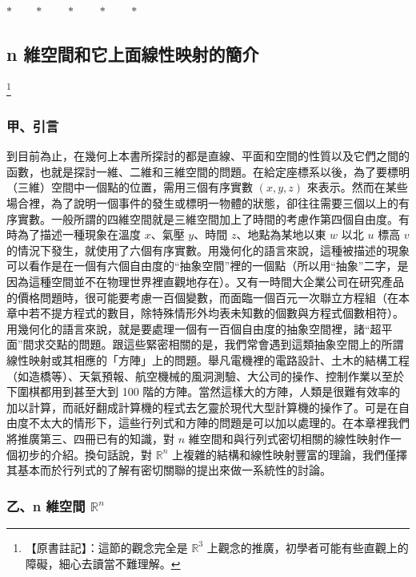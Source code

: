 \begin{center}
$* \qquad * \qquad * \qquad * \qquad *$
\end{center}

\subsection{n 維空間和它上面線性映射的簡介}\label{sec:b6s-1-1}
\footnote{【原書註記】：這節的觀念完全是 $\mathbb{R}^3$ 上觀念的推廣，初學者可能有些直觀上的障礙，細心去讀當不難理解。}

\subsubsection*{甲、引言}\label{subsec:b6s-1-1-a}

到目前為止，在幾何上本書所探討的都是直線、平面和空間的性質以及它們之間的函數，也就是探討一維、二維和三維空間的問題。在給定座標系以後，為了要標明（三維）空間中一個點的位置，需用三個有序實數 $(x, y, z)$ 來表示。然而在某些場合裡，為了說明一個事件的發生或標明一物體的狀態，卻往往需要三個以上的有序實數。一般所謂的四維空間就是三維空間加上了時間的考慮作第四個自由度。有時為了描述一種現象在溫度 $x$、氣壓 $y$、時間 $z$、地點為某地以東 $w$ 以北 $u$ 標高 $v$ 的情況下發生，就使用了六個有序實數。用幾何化的語言來說，這種被描述的現象可以看作是在一個有六個自由度的“抽象空間”裡的一個點（所以用“抽象”二字，是因為這種空間並不在物理世界裡直觀地存在）。又有一時間大企業公司在研究產品的價格問題時，很可能要考慮一百個變數，而面臨一個百元一次聯立方程組（在本章中若不提方程式的數目，除特殊情形外均表未知數的個數與方程式個數相符）。用幾何化的語言來說，就是要處理一個有一百個自由度的抽象空間裡，諸“超平面”間求交點的問題。跟這些緊密相關的是，我們常會遇到這類抽象空間上的所謂線性映射或其相應的「方陣」上的問題。舉凡電機裡的電路設計、土木的結構工程（如造橋等）、天氣預報、航空機械的風洞測驗、大公司的操作、控制作業以至於下圍棋都用到甚至大到 100 階的方陣。當然這樣大的方陣，人類是很難有效率的加以計算，而祇好翻成計算機的程式去乞靈於現代大型計算機的操作了。可是在自由度不太大的情形下，這些行列式和方陣的問題是可以加以處理的。在本章裡我們將推廣第三、四冊已有的知識，對 $n$ 維空間和與行列式密切相關的線性映射作一個初步的介紹。換句話說，對 $\mathbb{R}^n$ 上複雜的結構和線性映射豐富的理論，我們僅擇其基本而於行列式的了解有密切關聯的提出來做一系統性的討論。

\subsubsection*{乙、n 維空間 $\mathbb{R}^n$}\label{subsec:b6s-1-1-b}


